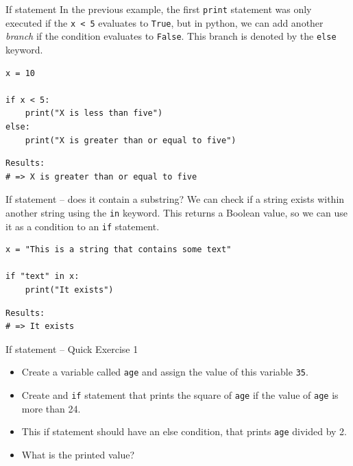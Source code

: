 \documentclass[10pt]{beamer}
\begin{document}
\begin{frame}[label={sec:orgbaaf115},fragile]{If statement}
 In the previous example, the first \texttt{print} statement was only executed if the \texttt{x < 5}
evaluates to \texttt{True}, but in python, we can add another \emph{branch} if the condition
evaluates to \texttt{False}. This branch is denoted by the \texttt{else} keyword.

\begin{verbatim}
x = 10

if x < 5:
    print("X is less than five")
else:
    print("X is greater than or equal to five")
\end{verbatim}

\begin{verbatim}
Results: 
# => X is greater than or equal to five
\end{verbatim}
\end{frame}

\begin{frame}[label={sec:orga9e65d0},fragile]{If statement -- does it contain a substring?}
 We can check if a string exists within another string using the \texttt{in} keyword. This
returns a Boolean value, so we can use it as a condition to an \texttt{if} statement.

\begin{verbatim}
x = "This is a string that contains some text"

if "text" in x:
    print("It exists")
\end{verbatim}

\begin{verbatim}
Results: 
# => It exists
\end{verbatim}
\end{frame}


\begin{frame}[label={sec:org9c512b1},fragile]{If statement -- Quick Exercise 1}
 \begin{itemize}
\item Create a variable called \texttt{age} and assign the value of this variable \texttt{35}.
\item Create and \texttt{if} statement that prints the square of \texttt{age} if the value of \texttt{age} is more
than 24.
\item This if statement should have an else condition, that prints \texttt{age} divided by 2.
\item What is the printed value?
\end{itemize}
\end{frame}
\end{document}
